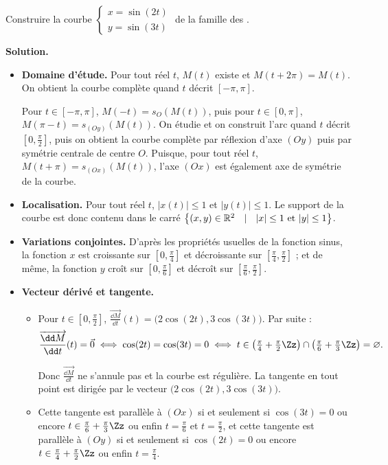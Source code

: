 \documentclass[class=report,crop=false]{standalone}
\begin{document}
\begin{exemple}
Construire la courbe $\left\{
\begin{array}{l}
x=\sin(2t)\\
y=\sin(3t)
\end{array}
\right.$ de la famille des .

\medskip
\textbf{Solution.}


\begin{itemize}
  \item \textbf{Domaine d'étude.}
  Pour tout réel $t$, $M(t)$ existe et $M(t+2\pi)=M(t)$.
On obtient la courbe complète quand $t$ décrit $[-\pi,\pi]$.

Pour $t\in[-\pi,\pi]$, $M(-t)=s_O(M(t))$, puis pour $t\in[0,\pi]$,
$M(\pi-t)=s_{(Oy)}(M(t))$. On étudie et on construit l'arc
quand $t$ décrit $[0,\frac{\pi}{2}]$, puis on obtient la courbe
complète par réflexion d'axe $(Oy)$ puis par symétrie centrale de centre
$O$. Puisque, pour tout réel $t$, $M(t+\pi)=s_{(Ox)}(M(t))$,
l'axe $(Ox)$ est également axe de symétrie de la courbe.

  \item \textbf{Localisation.}
  Pour tout réel $t$, $|x(t)|\leq1$ et $|y(t)|\leq1$.
Le support de la courbe est donc contenu dans le carré
$\big\{(x,y)\in\Rr^2 \ \  \mid \ \ |x|\leq1\ \text{et}\ |y|\leq1\big\}$.

  \item \textbf{Variations conjointes.}
  D'après les propriétés usuelles de la fonction sinus,
la fonction $x$ est croissante sur $[0,\frac{\pi}{4}]$ et décroissante
sur $[\frac{\pi}{4},\frac{\pi}{2}]$ ;
et de même, la fonction $y$ croît sur $[0,\frac{\pi}{6}]$ et décroît
sur $[\frac{\pi}{6},\frac{\pi}{2}]$.

  \item \textbf{Vecteur dérivé et tangente.}
  \begin{itemize}
    \item Pour $t\in[0,\frac{\pi}{2}]$, $\overrightarrow{\frac{\dd M}{\dd t}}(t)
=\big(2\cos(2t),3\cos(3t)\big)$. Par suite :
$$\overrightarrow{\frac{\dd M}{\dd t}}(t)=\vec{0}
\iff\cos(2t)=\cos(3t)=0
\iff t\in\big(\tfrac{\pi}{4}+\tfrac{\pi}{2}\Zz\big)\cap\big(\tfrac{\pi}{6}+\tfrac{\pi}{3}\Zz\big)=\varnothing.$$

Donc $\overrightarrow{\frac{\dd M}{\dd t}}$ ne s'annule pas et la courbe est régulière.
La tangente en tout point est dirigée par le vecteur $\big(2\cos(2t),3\cos(3t)\big)$.

    \item Cette tangente est parallèle à $(Ox)$ si et seulement si $\cos(3t)=0$ ou
encore $t\in\frac{\pi}{6}+\frac{\pi}{3}\Zz$ ou enfin
$t=\frac{\pi}{6}$ et $t=\frac{\pi}{2}$, et
cette tangente est parallèle à $(Oy)$ si et seulement si $\cos(2t)=0$
ou encore $t\in\frac{\pi}{4}+\frac{\pi}{2}\Zz$ ou enfin $t=\frac{\pi}{4}$.


\end{itemize}
\end{itemize}
\end{exemple}
\end{document}
